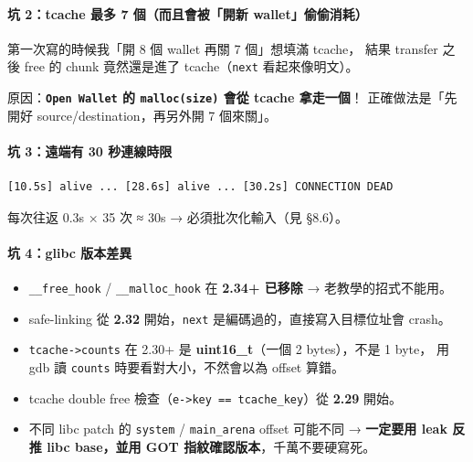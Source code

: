 \documentclass[10pt,a4paper]{article}
\providecommand{\tightlist}{%
  \setlength{\itemsep}{0pt}\setlength{\parskip}{0pt}}
\begin{document}
\paragraph{坑 2：tcache 最多 7 個（而且會被「開新
wallet」偷偷消耗）}\label{ux5751-2tcache-ux6700ux591a-7-ux500bux800cux4e14ux6703ux88abux958bux65b0-walletux5077ux5077ux6d88ux8017}

第一次寫的時候我「開 8 個 wallet 再關 7 個」想填滿 tcache， 結果
transfer 之後 free 的 chunk 竟然還是進了 tcache（\texttt{next}
看起來像明文）。

原因：\textbf{\texttt{Open\ \allowbreak{}Wallet} 的 \texttt{malloc(size)} 會從 tcache
拿走一個}！ 正確做法是「先開好 source/destination，再另外開 7 個來關」。

\paragraph{坑 3：遠端有 30
秒連線時限}\label{ux5751-3ux9060ux7aefux6709-30-ux79d2ux9023ux7ddaux6642ux9650}

\begin{Verbatim}[breaklines=true,breakanywhere=true,breakautoindent=false,fontsize=\fontsize{7.0}{9.5}\selectfont]
[10.5s] alive ... [28.6s] alive ... [30.2s] CONNECTION DEAD
\end{Verbatim}

每次往返 0.3s × 35 次 ≈ 30s → 必須批次化輸入（見 §8.6）。

\paragraph{坑 4：glibc
版本差異}\label{ux5751-4glibc-ux7248ux672cux5deeux7570}

\begin{itemize}
\tightlist
\item
  \texttt{\_\allowbreak{}\_\allowbreak{}free\_\allowbreak{}hook} / \texttt{\_\allowbreak{}\_\allowbreak{}malloc\_\allowbreak{}hook} 在 \textbf{2.34+
  已移除} → 老教學的招式不能用。
\item
  safe-linking 從 \textbf{2.32} 開始，\texttt{next}
  是編碼過的，直接寫入目標位址會 crash。
\item
  \texttt{tcache-\allowbreak{}\textgreater{}\allowbreak{}counts} 在 2.30+ 是
  \textbf{uint16\_t}（一個 2 bytes），不是 1 byte， 用 gdb 讀
  \texttt{counts} 時要看對大小，不然會以為 offset 算錯。
\item
  tcache double free
  檢查（\texttt{e-\allowbreak{}\textgreater{}\allowbreak{}key\ \allowbreak{}==\ \allowbreak{}tcache\_\allowbreak{}key}）從 \textbf{2.29}
  開始。
\item
  不同 libc patch 的 \texttt{system} / \texttt{main\_\allowbreak{}arena} offset
  可能不同 → \textbf{一定要用 leak 反推 libc base，並用 GOT
  指紋確認版本}，千萬不要硬寫死。
\end{itemize}
\end{document}
